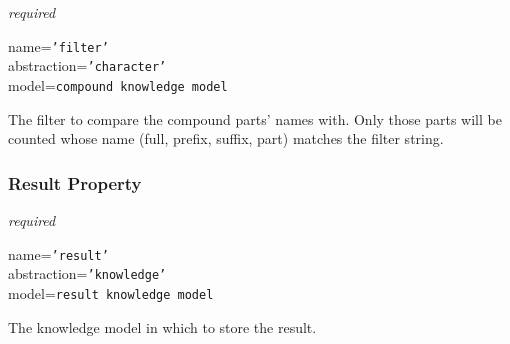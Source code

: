 \emph{required}

name=\texttt{'filter'}\\
abstraction=\texttt{'character'}\\
model=\texttt{compound knowledge model}

The filter to compare the compound parts' names with. Only those parts will be
counted whose name (full, prefix, suffix, part) matches the filter string.

\subsubsection{Result Property}

\emph{required}

name=\texttt{'result'}\\
abstraction=\texttt{'knowledge'}\\
model=\texttt{result knowledge model}

The knowledge model in which to store the result.
